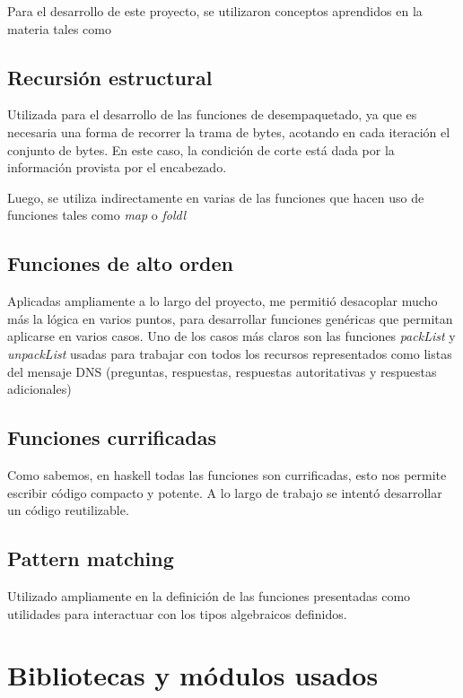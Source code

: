 \documentclass[6pt]{article}
\begin{document}
Para el desarrollo de este proyecto, se utilizaron conceptos aprendidos
en la materia tales como

\subsection{Recursión estructural}

Utilizada para el desarrollo de las funciones de desempaquetado, ya que
es necesaria una forma de recorrer la trama de bytes, acotando en
cada iteración el conjunto de bytes. En este caso, la condición de
corte está dada por la información provista por el encabezado.

Luego, se utiliza indirectamente en varias de las funciones que
hacen uso de funciones tales como \textit{map} o \textit{foldl}

\subsection{Funciones de alto orden}

Aplicadas ampliamente a lo largo del proyecto, me permitió desacoplar
mucho más la lógica en varios puntos, para desarrollar funciones
genéricas que permitan aplicarse en varios casos. Uno de los casos
más claros son las funciones \textit{packList} y \textit{unpackList}
usadas para trabajar con todos los recursos representados como listas
del mensaje DNS (preguntas, respuestas, respuestas autoritativas
y respuestas adicionales)

\subsection{Funciones currificadas}

Como sabemos, en haskell todas las funciones son currificadas, esto nos
permite escribir código compacto y potente. A lo largo de trabajo se
intentó desarrollar un código reutilizable.

\subsection{Pattern matching}

Utilizado ampliamente en la definición de las funciones presentadas
como utilidades para interactuar con los tipos algebraicos definidos.

\section{Bibliotecas y módulos usados}
\end{document}
